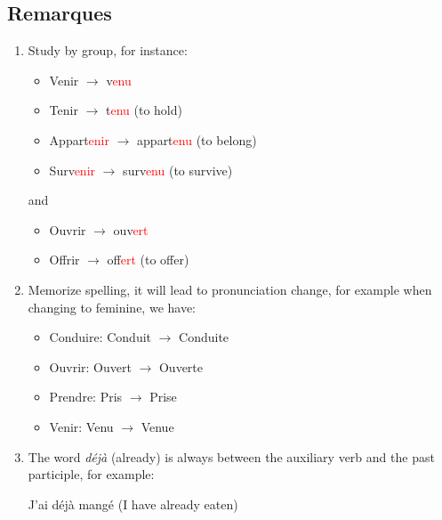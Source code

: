 \documentclass{book}
\begin{document}
\subsection{Remarques}

\begin{enumerate}
    \item Study by group, for instance:
    \begin{itemize}
        \item Venir $\rightarrow$ v\textcolor{red}{enu}
        \item Tenir $\rightarrow$ t\textcolor{red}{enu} (to hold)
        \item Appart\textcolor{red}{enir} $\rightarrow$ appart\textcolor{red}{enu} (to belong)
        \item Surv\textcolor{red}{enir} $\rightarrow$ surv\textcolor{red}{enu} (to survive)
    \end{itemize}
    and
    \begin{itemize}
        \item Ouvrir $\rightarrow$ ouv\textcolor{red}{ert}
        \item Offrir $\rightarrow$ off\textcolor{red}{ert} (to offer)
    \end{itemize}
    \item Memorize spelling, it will lead to pronunciation change, for example when changing to feminine, we have:
    \begin{itemize}
        \item Conduire: Conduit \textipa{[k\~o.d\~i]} $\rightarrow$ Conduite \textipa{[k\~o.d\~it]}
        \item Ouvrir: Ouvert \textipa{[u.v\~e]} $\rightarrow$ Ouverte \textipa{[u.v\~\textepsilon]}
        \item Prendre: Pris \textipa{[p\~Ri]} $\rightarrow$ Prise \textipa{[p\~Riz]}
        \item Venir: Venu \textipa{[v\~\textepsilon.ny]} $\rightarrow$ Venue \textipa{[v\~\textepsilon.ny]}
    \end{itemize}
    \item The word \textit{déjà} (already) is always between the auxiliary verb and the past participle, for example:
    \begin{center}
        J'ai déjà mangé (I have already eaten)
    \end{center}
\end{enumerate}
\end{document}
